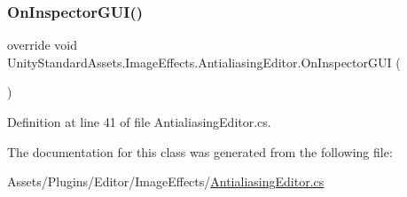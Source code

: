 \subsubsection{\texorpdfstring{On\+Inspector\+G\+U\+I()}{OnInspectorGUI()}}
{\footnotesize\ttfamily override void Unity\+Standard\+Assets.\+Image\+Effects.\+Antialiasing\+Editor.\+On\+Inspector\+G\+UI (\begin{DoxyParamCaption}{ }\end{DoxyParamCaption})}



Definition at line 41 of file Antialiasing\+Editor.\+cs.



The documentation for this class was generated from the following file\+:\begin{DoxyCompactItemize}
\item 
Assets/\+Plugins/\+Editor/\+Image\+Effects/\mbox{\hyperlink{_antialiasing_editor_8cs}{Antialiasing\+Editor.\+cs}}\end{DoxyCompactItemize}
